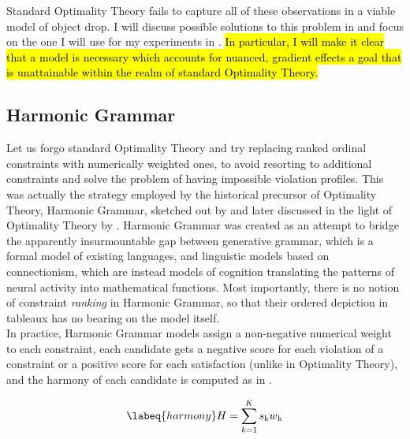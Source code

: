 Standard Optimality Theory fails to capture all of these observations in a viable model of object drop. I will discuss possible solutions to this problem in  and focus on the one I will use for my experiments in . \hl{In particular, I will make it clear that a model is necessary which accounts for nuanced, gradient effects \textemdash a goal that is unattainable within the realm of standard Optimality Theory.}

\subsection{Harmonic Grammar}  %
Let us forgo standard Optimality Theory and try replacing ranked ordinal constraints with numerically weighted ones, to avoid resorting to additional constraints and solve the problem of having impossible violation profiles. 
This was actually the strategy employed by the historical precursor of Optimality Theory, Harmonic Grammar, sketched out by \textcite{smolensky1993integrating, legendre1990can, legendre1991unifying} and later discussed in the light of Optimality Theory by \textcite{legendre2006optimality, pater2009weighted}. Harmonic Grammar was created as an attempt to bridge the apparently insurmountable gap between generative grammar, which is a formal model of existing languages, and linguistic models based on connectionism, which are instead models of cognition translating the patterns of neural activity into mathematical functions. Most importantly, there is no notion of constraint \textit{ranking} in Harmonic Grammar, so that their ordered depiction in tableaux has no bearing on the model itself.\\
In practice, Harmonic Grammar models assign a non-negative numerical weight to each constraint, each candidate gets a negative score for each violation of a constraint or a positive score for each satisfaction (unlike in Optimality Theory), and the harmony of each candidate is computed as in . 

\begin{equation} \labeq{harmony} %
H = \sum_{k=1}^{K} s\textsubscript{k} w\textsubscript{k}
\end{equation}

